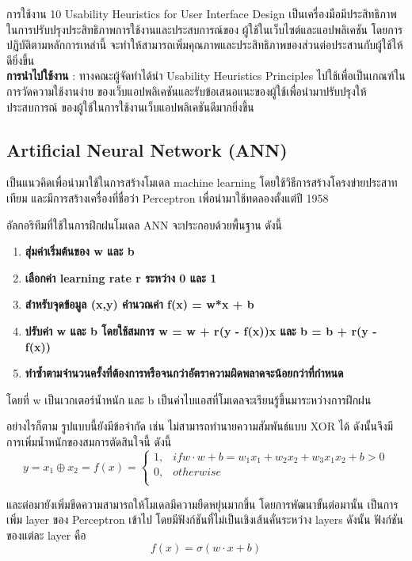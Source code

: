 \par การใช้งาน 10 Usability Heuristics for User Interface Design 
เป็นเครื่องมือมีประสิทธิภาพในการปรับปรุงประสิทธิภาพการใช้งานและประสบการณ์ของ
ผู้ใช้ในเว็บไซต์และแอปพลิเคชัน โดยการปฏิบัติตามหลักการเหล่านี้ 
จะทำให้สามารถเพิ่มคุณภาพและประสิทธิภาพของส่วนต่อประสานกับผู้ใช้ให้ดียิ่งขึ้น \\
\textbf{การนำไปใช้งาน} : ทางคณะผู้จัดทำได้นำ 
Usability Heuristics Principles ไปใช้เพื่อเป็นเกณฑ์ในการวัดความใช้งานง่าย
ของเว็บแอปพลิเคชันและรับข้อเสนอแนะของผู้ใช้เพื่อนำมาปรับปรุงให้ประสบการณ์
ของผู้ใช้ในการใช้งานเว็บแอปพลิเคชันดีมากยิ่งขึ้น

\subsection{Artificial Neural Network (ANN)}
เป็นแนวคิดเพื่อนำมาใช้ในการสร้างโมเดล machine learning โดยใช้วิธีการสร้างโครงข่ายประสาทเทียม
และมีการสร้างเครื่องที่ชื่อว่า Perceptron เพื่อนำมาใช้ทดลองตั้งแต่ปี 1958

อัลกอริทึมที่ใช้ในการฝึกฝนโมเดล ANN จะประกอบด้วยพื้นฐาน ดังนี้
\begin{enumerate}
    \item \textbf{สุ่มค่าเริ่มต้นของ w และ b} 
    \item \textbf{เลือกค่า learning rate r ระหว่าง 0 และ 1} 
    \item \textbf{สำหรับจุดข้อมูล (x,y) คำนวณค่า f(x) = w*x + b} 
    \item \textbf{ปรับค่า w และ b โดยใช้สมการ w = w + r(y - f(x))x และ b = b + r(y - f(x))} 
    \item \textbf{ทำซ้ำตามจำนวนครั้งที่ต้องการหรือจนกว่าอัตราความผิดพลาดจะน้อยกว่าที่กำหนด} 
\end{enumerate}
โดยที่ w เป็นเวกเตอร์น้ำหนัก และ b เป็นค่าไบแอสที่โมเดลจะเรียนรู้ขึ้นมาระหว่างการฝึกฝน

อย่างไรก็ตาม รูปแบบนี้ยังมีข้อจำกัด เช่น ไม่สามารถทำนายความสัมพันธ์แบบ XOR ได้ ดังนั้นจึงมีการเพิ่มน้ำหนักของสมการตัดสินใจนี้ ดังนี้
\[
    y=x_{1}\oplus x_{2}=f(x)=
    \begin{cases} 
    1, & if w \cdot w + b = w_{1}x_{1} + w_{2}x_{2} + w_{3}x_{1}x_{2} + b > 0 \\
    0, & otherwise \\
    \end{cases}
\]

และต่อมายังเพิ่มขีดความสามารถให้โมเดลมีความยืดหยุ่นมากขึ้น โดยการพัฒนาขั้นต่อมานั้น เป็นการเพิ่ม layer ของ Perceptron เข้าไป โดยมีฟังก์ชันที่ไม่เป็นเชิงเส้นคั่นระหว่าง layers ดังนั้น ฟังก์ชันของแต่ละ layer คือ
\[f(x)=\sigma(w \cdot x + b)\]

